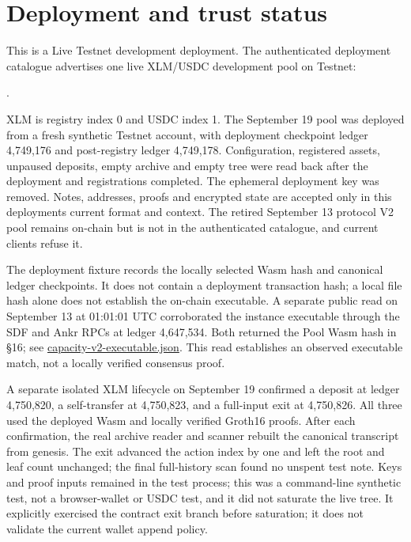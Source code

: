 \documentclass[11pt,letterpaper]{article}
\begin{document}
\section{Deployment and trust status}\label{deployment-and-trust-status}

This is a Live Testnet development deployment. The authenticated
deployment catalogue advertises one live XLM/\allowbreak{}USDC
development pool on Testnet:

{\ttfamily{}}.

XLM is registry index 0 and USDC index 1. The September 19 pool was
deployed from a fresh synthetic Testnet account, with deployment
checkpoint ledger 4,749,176 and post-registry ledger 4,749,178.
Configuration, registered assets, unpaused deposits, empty archive and
empty tree were read back after the deployment and registrations
completed. The ephemeral deployment key was removed. Notes, addresses,
proofs and encrypted state are accepted only in this
deployment\textquotesingle s current format and context. The retired
September 13 protocol V2 pool
{\ttfamily{}}
remains on-chain but is not in the authenticated catalogue, and current
clients refuse it.

The deployment fixture records the locally selected Wasm hash and
canonical ledger checkpoints. It does not contain a deployment
transaction hash; a local file hash alone does not establish the
on-chain executable. A separate public read on September 13 at 01:01:01
UTC corroborated the instance executable through the SDF and Ankr RPCs
at ledger 4,647,534. Both returned the Pool Wasm hash in \S{}16; see
\href{https://github.com/stellarchain/io.stellarkey/blob/v1.1.2/protocol/private-balance/results/capacity-v2-executable.json}{capacity-v2-executable.json}.
This read establishes an observed executable match, not a locally
verified consensus proof.

A separate isolated XLM lifecycle on September 19 confirmed a deposit at
ledger 4,750,820, a self-transfer at 4,750,823, and a full-input exit at
4,750,826. All three used the deployed Wasm and locally verified Groth16
proofs. After each confirmation, the real archive reader and scanner
rebuilt the canonical transcript from genesis. The exit advanced the
action index by one and left the root and leaf count unchanged; the
final full-history scan found no unspent test note. Keys and proof
inputs remained in the test process; this was a command-line synthetic
test, not a browser-wallet or USDC test, and it did not saturate the
live tree. It explicitly exercised the contract exit branch before
saturation; it does not validate the current wallet append policy.
\end{document}
